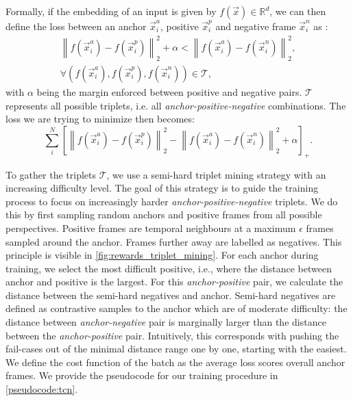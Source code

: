 \documentclass[\home/main.tex]{subfiles}
\begin{document}
Formally, if the embedding of an input is given by $f(\vec{x}) \in \mathbb{R}^d$, we can then define the loss between an anchor $\vec{x}_i^a$, positive $\vec{x}_i^p$ and negative frame $\vec{x}_i^n$ as \autocite{FaceNet}:
\begin{align}
    \left\|f\left(\vec{x}_{i}^{a}\right)-f\left(\vec{x}_{i}^{p}\right)\right\|_{2}^{2}+\alpha<\left\|f\left(\vec{x}_{i}^{a}\right)-f\left(\vec{x}_{i}^{n}\right)\right\|_{2}^{2} \nonumber, \\
    \forall\left(f\left(\vec{x}_{i}^{a}\right), f\left(\vec{x}_{i}^{p}\right), f\left(\vec{x}_{i}^{n}\right)\right) \in \mathcal{T},    \nonumber
\end{align}
with $\alpha$ being the margin enforced between positive and negative pairs. $\mathcal{T}$ represents all possible triplets, i.e. all \textit{anchor-positive-negative} combinations. The loss we are trying to minimize then becomes:
\begin{equation*}
    \sum_{i}^{N}\left[\left\|f\left(\vec{x}_{i}^{a}\right)-f\left(\vec{x}_{i}^{p}\right)\right\|_{2}^{2}-\left\|f\left(\vec{x}_{i}^{a}\right)-f\left(\vec{x}_{i}^{n}\right)\right\|_{2}^{2}+\alpha\right]_{+}.
\end{equation*}

To gather the triplets $\mathcal{T}$, we use a semi-hard triplet mining strategy with an increasing difficulty level. The goal of this strategy is to guide the training process to focus on increasingly harder \textit{anchor-positive-negative} triplets. We do this by first sampling random anchors and positive frames from all possible perspectives. Positive frames are temporal neighbours at a maximum $\epsilon$ frames sampled around the anchor. Frames further away are labelled as negatives. This principle is visible in \cref{fig:rewards_triplet_mining}. For each anchor during training, we select the most difficult positive, i.e., where the distance between anchor and positive is the largest. For this \textit{anchor-positive} pair, we calculate the distance between the semi-hard negatives and anchor. Semi-hard negatives are defined as contrastive samples to the anchor which are of moderate difficulty: the distance between \textit{anchor-negative} pair is marginally larger than the distance between the \textit{anchor-positive} pair. Intuitively, this corresponds with pushing the fail-cases out of the minimal distance range one by one, starting with the easiest. We define the cost function of the batch as the average loss scores overall anchor frames. We provide the pseudocode for our training procedure in \cref{pseudocode:tcn}.
\end{document}
